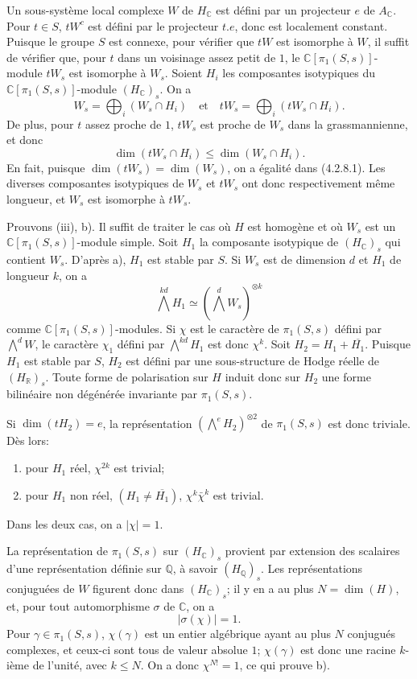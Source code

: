 \documentclass[10pt]{article}
\newcommand{\C}{\mathbb C}
\newcommand{\Q}{\mathbb Q}
\newcommand{\R}{\mathbb R}
\begin{document}
Un sous-système local complexe $W$ de $H_\C$ est défini par un projecteur $e$ de $A_\C$. Pour $t\in S$, $tW^c$ est défini par le projecteur $t.e$, donc est localement constant. Puisque le groupe $S$ est connexe, pour vérifier que $tW$ est isomorphe à $W$, il suffit de vérifier que, pour $t$ dans un voisinage assez petit de $1$, le $\C[\pi_1(S,s)]$-module $tW_s$ est isomorphe à $W_s$. Soient $H_i$ les composantes isotypiques du $\C[\pi_1(S,s)]$-module $(H_\C)_s$. On a
\[
W_s=\bigoplus_i(W_s\cap H_i)
\quad\text{et}\quad
tW_s=\bigoplus_i(tW_s\cap H_i).
\]
De plus, pour $t$ assez proche de $1$, $tW_s$ est proche de $W_s$ dans la grassmannienne, et donc
\[
\tag{4.2.8.1}
\dim(tW_s\cap H_i)\le \dim(W_s\cap H_i).
\]
En fait, puisque $\dim(tW_s)=\dim(W_s)$, on a égalité dans (4.2.8.1). Les diverses composantes isotypiques de $W_s$ et $tW_s$ ont donc respectivement même longueur, et $W_s$ est isomorphe à $tW_s$.

Prouvons (iii), b). Il suffit de traiter le cas où $H$ est homogène et où $W_s$ est un $\C[\pi_1(S,s)]$-module simple. Soit $H_1$ la composante isotypique de $(H_\C)_s$ qui contient $W_s$. D'après a), $H_1$ est stable par $S$. Si $W_s$ est de dimension $d$ et $H_1$ de longueur $k$, on a
\[
\bigwedge^{kd}H_1\simeq(\bigwedge^dW_s)^{\otimes k}
\]
comme $\C[\pi_1(S,s)]$-modules. Si $\chi$ est le caractère de $\pi_1(S,s)$ défini par $\bigwedge^dW$, le caractère $\chi_1$ défini par $\bigwedge^{kd}H_1$ est donc $\chi^k$. Soit $H_2=H_1+\overline{H_1}$. Puisque $H_1$ est stable par $S$, $H_2$ est défini par une sous-structure de Hodge réelle de $(H_\R)_s$. Toute forme de polarisation sur $H$ induit donc sur $H_2$ une forme bilinéaire non dégénérée invariante par $\pi_1(S,s)$.

Si $\dim(tH_2)=e$, la représentation $(\bigwedge^eH_2)^{\otimes2}$ de $\pi_1(S,s)$ est donc triviale. Dès lors:
\begin{enumerate}[label=\alph*)]
\item pour $H_1$ réel, $\chi^{2k}$ est trivial;
\item pour $H_1$ non réel, $(H_1\ne\overline{H_1})$, $\chi^k\bar\chi^k$ est trivial.
\end{enumerate}
Dans les deux cas, on a $|\chi|=1$.

La représentation de $\pi_1(S,s)$ sur $(H_\C)_s$ provient par extension des scalaires d'une représentation définie sur $\Q$, à savoir $(H_\Q)_s$. Les représentations conjuguées de $W$ figurent donc dans $(H_\C)_s$; il y en a au plus $N=\dim(H)$, et, pour tout automorphisme $\sigma$ de $\C$, on a
\[
|\sigma(\chi)|=1.
\]
Pour $\gamma\in\pi_1(S,s)$, $\chi(\gamma)$ est un entier algébrique ayant au plus $N$ conjugués complexes, et ceux-ci sont tous de valeur absolue $1$; $\chi(\gamma)$ est donc une racine $k$-ième de l'unité, avec $k\le N$. On a donc $\chi^{N!}=1$, ce qui prouve b).
\end{document}
